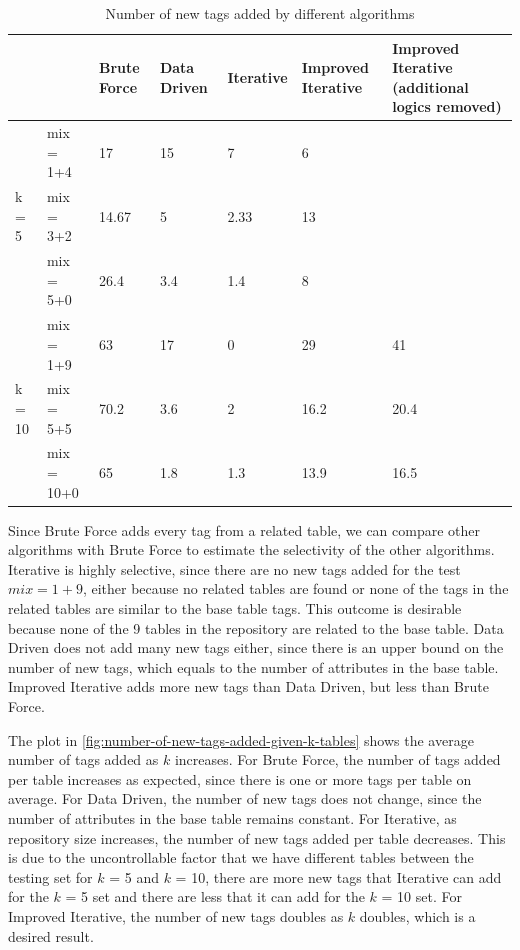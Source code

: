 \begin{table}[h!]
    \centering
    \scriptsize
    \begin{center}
      \caption{Number of new tags added by different algorithms}
      \label{tab:Number-of-new-tags-added-by-different-algorithms}
      \begin{tabular}{|p{}|p{}|p{}|p{}|p{}|p{}|p{}|}  
        \hline
         & & \textbf{Brute Force} & \textbf{Data Driven} & \textbf{Iterative} & \textbf{Improved Iterative} & \textbf{Improved Iterative (additional logics removed)}\\
        \hline
        \multirow{3}{*}{k = 5} & mix = 1+4 & 17 & 15 & 7 & 6 & \\
        \cline{2-7}
        & mix = 3+2 & 14.67 & 5 & 2.33 & 13 & \\
        \cline{2-7}
        & mix = 5+0 & 26.4 & 3.4 & 1.4 & 8 & \\
        \hline        
        \multirow{3}{*}{k = 10} & mix = 1+9 & 63 & 17 & 0 & 29 & 41 \\
        \cline{2-7}
        & mix = 5+5 & 70.2 & 3.6 & 2 & 16.2 & 20.4 \\
        \cline{2-7}
        & mix = 10+0 & 65 & 1.8 & 1.3 & 13.9 & 16.5 \\
        \hline
      \end{tabular}
    \end{center}
\end{table}

Since Brute Force adds every tag from a related table, we can compare other algorithms with Brute Force to estimate the selectivity of the other algorithms. Iterative is highly selective, since there are no new tags added for the test $mix = 1+9$, either because no related tables are found or none of the tags in the related tables are similar to the base table tags. This outcome is desirable because none of the 9 tables in the repository are related to the base table. Data Driven does not add many new tags either, since there is an upper bound on the number of new tags, which equals to the number of attributes in the base table. Improved Iterative adds more new tags than Data Driven, but less than Brute Force.

The plot in \autoref{fig:number-of-new-tags-added-given-k-tables} shows the average number of tags added as $k$ increases. For Brute Force, the number of tags added per table increases as expected, since there is one or more tags per table on average. For Data Driven, the number of new tags does not change, since the number of attributes in the base table remains constant. For Iterative, as repository size increases, the number of new tags added per table decreases. This is due to the uncontrollable factor that we have different tables between the testing set for $k$ = 5 and $k$ = 10, there are more new tags that Iterative can add for the $k$ = 5 set and there are less that it can add for the $k$ = 10 set. For Improved Iterative, the number of new tags doubles as $k$ doubles, which is a desired result.

